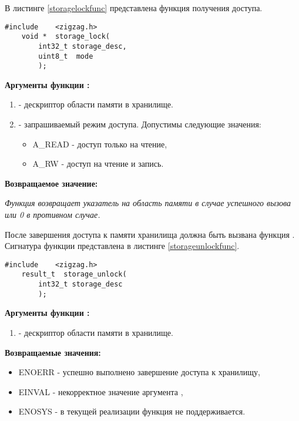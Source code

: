 В листинге \ref{storagelockfunc} представлена функция получения доступа.

\begin{lstlisting}[caption=Функция \myfunc{storage\_lock()} - доступ к хранилищу, label=storagelockfunc ]
    #include    <zigzag.h>
    void *  storage_lock(
        int32_t storage_desc,
        uint8_t  mode
        );
\end{lstlisting}

{\bfseries Аргументы функции :}

{\itshape
\begin{enumerate} 
\item {} - дескриптор области памяти в хранилище.
\item {} - запрашиваемый режим доступа. Допустимы следующие значения:
    \begin{itemize}
        \item A\_READ - доступ только на чтение,
        \item A\_RW - доступ на чтение и запись.
    \end{itemize}
\end{enumerate}
}

{\bfseries Возвращаемое значение:}

{\itshape
Функция возвращает указатель на область памяти в случае успешного вызова или 0 в противном случае.
}

После завершения доступа к памяти хранилища должна быть вызвана функция .
Сигнатура функции представлена в листинге \ref{storageunlockfunc}.

\begin{lstlisting}[caption=Функция \myfunc{storage\_unlock()} - завершение доступа, label=storageunlockfunc ]
    #include    <zigzag.h>
    result_t  storage_unlock(
        int32_t storage_desc
        );
\end{lstlisting}

{\bfseries Аргументы функции :}

{\itshape
\begin{enumerate} 
\item {} - дескриптор области памяти в хранилище.
\end{enumerate}
}

{\bfseries Возвращаемые значения:}

{\itshape
\begin{itemize}
\item ENOERR - успешно выполнено завершение доступа к хранилищу,
\item EINVAL - некорректное значение аргумента ,
\item ENOSYS - в текущей реализации функция не поддерживается.
\end{itemize}
}

